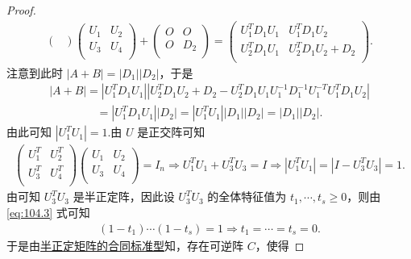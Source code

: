 \documentclass[../../main.tex]{subfiles}%
\begin{document}
\begin{proof}
\begin{align*}
\begin{pmatrix}
\end{pmatrix} \begin{pmatrix}
U_1&		U_2\\
U_3&		U_4\\
\end{pmatrix} +\begin{pmatrix}
O&		O\\
O&		D_2\\
\end{pmatrix} =\begin{pmatrix}
U_{1}^{T}D_1U_1&		U_{1}^{T}D_1U_2\\
U_{2}^{T}D_1U_1&		U_{2}^{T}D_1U_2+D_2\\
\end{pmatrix}.
\end{align*}
注意到此时 $\left| A+B \right|=\left| D_1 \right|\left| D_2 \right|$，于是
\begin{align*}
\left| A+B \right|=\left| U_{1}^{T}D_1U_1 \right|\left| U_{2}^{T}D_1U_2+D_2-U_{2}^{T}D_1U_1U_{1}^{-1}D_{1}^{-1}U_{1}^{-T}U_{1}^{T}D_1U_2 \right|
\end{align*}
\begin{align*}
=\left| U_{1}^{T}D_1U_1 \right|\left| D_2 \right|=\left| U_{1}^{T}U_1 \right|\left| D_1 \right|\left| D_2 \right|=\left| D_1 \right|\left| D_2 \right|.
\end{align*}
由此可知 $\left| U_{1}^{T}U_1 \right|=1$.由 $U$ 是正交阵可知
\begin{align}
\begin{pmatrix}
U_{1}^{T}&		U_{2}^{T}\\
U_{3}^{T}&		U_{4}^{T}\\
\end{pmatrix} \begin{pmatrix}
U_1&		U_2\\
U_3&		U_4\\
\end{pmatrix} =I_n\Rightarrow U_{1}^{T}U_1+U_{3}^{T}U_3=I\Rightarrow \left| U_{1}^{T}U_1 \right|=\left| I-U_{3}^{T}U_3 \right|=1.\label{eq:104.3}
\end{align}
由可知 $U_{3}^{T}U_3$ 是半正定阵，因此设 $U_{3}^{T}U_3$ 的全体特征值为 $t_1,\cdots ,t_s\geqslant 0$，则由 \eqref{eq:104.3} 式可知
\begin{align*}
\left( 1-t_1 \right) \cdots \left( 1-t_s \right) =1\Rightarrow t_1=\cdots =t_s=0.
\end{align*}
于是由\hyperref[theorem:正定矩阵的充要条件]{半正定矩阵的合同标准型}知，存在可逆阵 $C$，使得

\end{proof}
\end{document}

